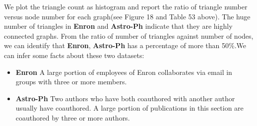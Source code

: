We plot the triangle count as histogram and report the ratio of triangle number versus node number for each graph(see Figure 18 and Table 53 above). The huge number of triangles in \textbf{Enron} and \textbf{Astro-Ph} indicate that they are highly connected graphs. From the ratio of number of triangles against number of nodes, we can identify that \textbf{Enron}, \textbf{Astro-Ph} has a percentage of more than 50\%.We can infer some facts about these two datasets:

\begin{itemize}
\item \textbf{Enron} A large portion of employees of Enron collaborates via email in groups with three or more members.
\item \textbf{Astro-Ph} Two authors who have both coauthored with another author usually have coauthored. A large portion of publications in this section are coauthored by three or more authors.
\end{itemize}